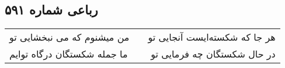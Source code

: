\begin{center}
\section*{رباعی شماره ۵۹۱}
\label{sec:sh591}
\begin{longtable}{l p{0.5cm} r}
من میشنوم که می نبخشایی تو
&&
هر جا که شکسته‌ایست آنجایی تو
\\
ما جمله شکستگان درگاه توایم
&&
در حال شکستگان چه فرمایی تو
\\
\end{longtable}
\end{center}
